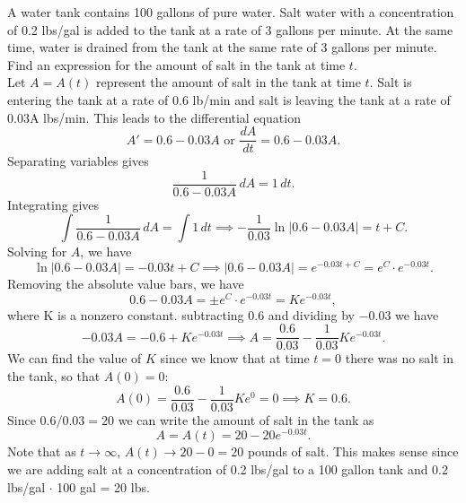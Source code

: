 \documentclass[handout]{ximera}
\begin{document}
\begin{example}[example 6]
A water tank contains 100 gallons of pure water. Salt water with a concentration of 0.2 lbs/gal is added to the tank at a rate of 3 gallons per minute.
At the same time, water is drained from the tank at the same rate of 3 gallons per minute.
Find an expression for the amount of salt in the tank at time $t$.\\
Let $A = A(t)$ represent the amount of salt in the tank at time $t$. Salt is entering the tank at a rate of 0.6 lb/min and 
salt is leaving the tank at a rate of 0.03A lbs/min. This leads to the differential equation
\[
A' = 0.6 - 0.03A \text{  or  } \frac{dA}{dt} = 0.6 - 0.03A.
\]
Separating variables gives
\[
\frac{1}{0.6 -0.03A} \, dA = 1\, dt.
\]
Integrating gives
\[
\int \frac{1}{0.6 -0.03A} \, dA = \int 1 \, dt \implies -\frac{1}{0.03}\ln|0.6 - 0.03A|  = t + C.
\]
Solving for $A$, we have
\[
\ln|0.6 - 0.03A|  = -0.03t + C \implies |0.6-0.03A| = e^{-0.03t + C} = e^C \cdot e^{-0.03t}.
\]
Removing the absolute value bars, we have
\[
0.6 - 0.03A = \pm e^C \cdot e^{-0.03t} = Ke^{-0.03t},
\]
where K is a nonzero constant.
subtracting $0.6$ and dividing by $-0.03$ we have 
\[
-0.03A = -0.6 + Ke^{-0.03t} \implies A = \frac{0.6}{0.03} - \frac{1}{0.03}Ke^{-0.03t}.
\]
We can find the value of $K$ since we know that at time $t = 0$ there was no salt in the tank, so that $A(0) = 0$:
\[
A(0) = \frac{0.6}{0.03} - \frac{1}{0.03}Ke^0 = 0 \implies  K = 0.6.
\]
Since $0.6/0.03 = 20$ we can write the amount of salt in the tank as
\[
A= A(t) = 20 - 20e^{-0.03t}.
\]
Note that as $t\to \infty$, $A(t) \to 20 - 0 = 20$ pounds of salt. 
This makes sense since we are adding salt at a concentration of 0.2 lbs/gal to a 100 gallon tank and 0.2 lbs/gal $\cdot$ 100 gal = 20 lbs.
\end{example}
\end{document}
